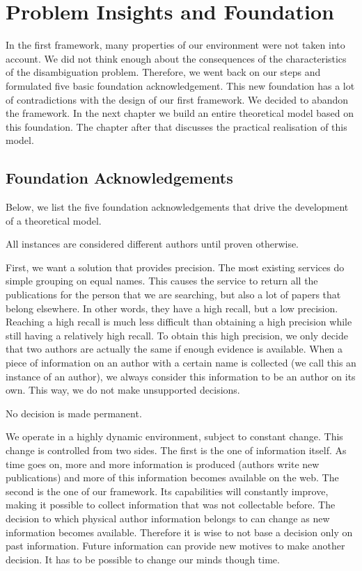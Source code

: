 \chapter{Problem Insights and Foundation}

In the first framework, many properties of our environment were not taken into account. We did not think enough about the consequences of the characteristics of the disambiguation problem. Therefore, we went back on our steps and formulated five basic foundation acknowledgement. This new foundation has a lot of contradictions with the design of our first framework. We decided to abandon the framework. In the next chapter we build an entire theoretical model based on this foundation. The chapter after that discusses the practical realisation of this model.

\section{Foundation Acknowledgements}
\label{foundation}

Below, we list the five foundation acknowledgements that drive the development of a theoretical model.

\begin{foundation}
\label{foundation:different}
All instances are considered different authors until proven otherwise.
\end{foundation}

First, we want a solution that provides precision. The most existing services do simple grouping on equal names. This causes the service to return all the publications for the person that we are searching, but also a lot of papers that belong elsewhere. In other words, they have a high recall, but a low precision. Reaching a high recall is much less difficult than obtaining a high precision while still having a relatively high recall. To obtain this high precision, we only decide that two authors are actually the same if enough evidence is available. When a piece of information on an author with a certain name is collected (we call this an instance of an author), we always consider this information to be an author on its own. This way, we do not make unsupported decisions.

\begin{foundation}
\label{foundation:decision}
No decision is made permanent.
\end{foundation}

We operate in a highly dynamic environment, subject to constant change. This change is controlled from two sides. The first is the one of information itself. As time goes on, more and more information is produced (authors write new publications) and more of this information becomes available on the web. The second is the one of our framework. Its capabilities will constantly improve, making it possible to collect information that was not collectable before. The decision to which physical author information belongs to can change as new information becomes available. Therefore it is wise to not base a decision only on past information. Future information can provide new motives to make another decision. It has to be possible to change our minds though time.

